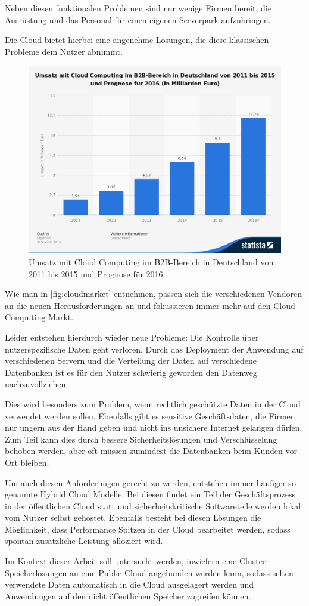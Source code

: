 Neben diesen funktionalen Problemen sind nur wenige Firmen bereit, die Ausrüstung und das Personal für einen eigenen Serverpark aufzubringen.

Die Cloud bietet hierbei eine angenehme Lösungen, die diese klassischen Probleme dem Nutzer abnimmt.

\begin{figure}[hbt]
	\centering
	\includegraphics[scale=0.5]{images/cloud-computing-market}
	\caption{Umsatz mit Cloud Computing im B2B-Bereich in Deutschland von 2011 bis 2015 und Prognose für 2016 \parencite{statistia.2015}}
	\label{fig:cloudmarket}
\end{figure}

Wie man in \autoref{fig:cloudmarket} entnehmen, passen sich die verschiedenen Vendoren an die neuen Herausforderungen an und fokussieren immer mehr auf den Cloud Computing Markt.

Leider entstehen hierdurch wieder neue Probleme: Die Kontrolle über nutzerspezifische Daten geht verloren. Durch das Deployment der Anwendung auf verschiedenen Servern und die Verteilung der Daten auf verschiedene Datenbanken ist es für den Nutzer schwierig geworden den Datenweg nachzuvollziehen.

Dies wird besonders zum Problem, wenn rechtlich geschützte Daten in der Cloud verwendet werden sollen. Ebenfalls gibt es sensitive Geschäftsdaten, die Firmen nur ungern aus der Hand geben und nicht ins unsichere Internet gelangen dürfen.
Zum Teil kann dies durch bessere Sicherheitslösungen und Verschlüsselung behoben werden, aber oft müssen zumindest die Datenbanken beim Kunden vor Ort bleiben. 

Um auch diesen Anforderungen gerecht zu werden, entstehen immer häufiger so genannte Hybrid Cloud Modelle. Bei diesen findet ein Teil der Geschäftsprozess in der öffentlichen Cloud statt und sicherheitskritische Softwareteile werden lokal vom Nutzer selbst gehostet. Ebenfalls besteht bei diesen Lösungen die Möglichkeit, dass Performance Spitzen in der Cloud bearbeitet werden, sodass spontan zusätzliche Leistung alloziert wird.

Im Kontext dieser Arbeit soll untersucht werden, inwiefern eine Cluster Speicherlösungen an eine Public Cloud angebunden werden kann, sodass selten verwendete Daten automatisch in die Cloud ausgelagert werden und Anwendungen auf den nicht öffentlichen Speicher zugreifen können.  